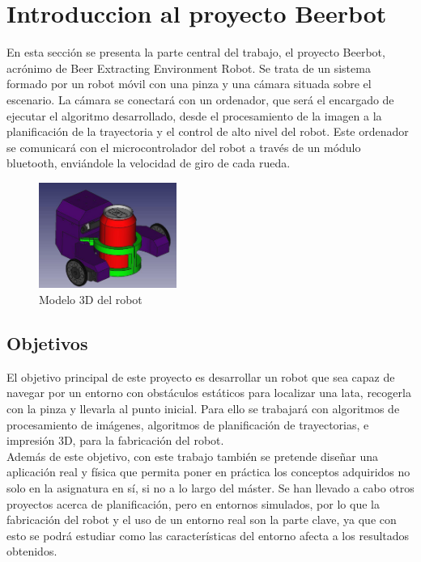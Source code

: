 \section{Introduccion al proyecto Beerbot}
\label{introduccion_desarrollo}

En esta sección se presenta la parte central del trabajo, el proyecto Beerbot, acrónimo de Beer Extracting Environment Robot. Se trata de un sistema formado por un robot móvil con una pinza y una cámara situada sobre el escenario. La cámara se conectará con un ordenador, que será el encargado de ejecutar el algoritmo desarrollado, desde el procesamiento de la imagen a la planificación de la trayectoria y el control de alto nivel del robot. Este ordenador se comunicará con el microcontrolador del robot a través de un módulo bluetooth, enviándole la velocidad de giro de cada rueda.\\

\begin{figure}[H]
        \centering
        \includegraphics[width=0.4\textwidth]{images/robot.jpg}
        \caption{Modelo 3D del robot}
        \label{fig:robot}
\end{figure} 

\subsection{Objetivos}

El objetivo principal de este proyecto es desarrollar un robot que sea capaz de navegar por un entorno con obstáculos estáticos para localizar una lata, recogerla con la pinza y llevarla al punto inicial. Para ello se trabajará con algoritmos de procesamiento de imágenes, algoritmos de planificación de trayectorias, e impresión 3D, para la fabricación del robot.\\

Además de este objetivo, con este trabajo también se pretende diseñar una aplicación real y física que permita poner en práctica los conceptos adquiridos no solo en la asignatura en sí, si no a lo largo del máster. Se han llevado a cabo otros proyectos acerca de planificación, pero en entornos simulados, por lo que la fabricación del robot y el uso de un entorno real son la parte clave, ya que con esto se podrá estudiar como las características del entorno afecta a los resultados obtenidos.\\
 
